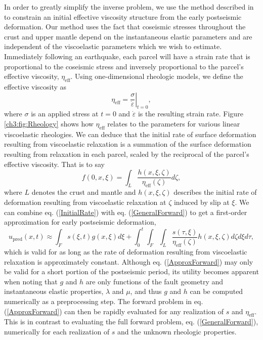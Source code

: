 In order to greatly simplify the inverse problem, we use the method
described in \citet{Hines2016} to constrain an initial effective
viscosity structure from the early postseismic deformation.  Our
method uses the fact that coseismic stresses throughout the crust and
upper mantle depend on the instantaneous elastic parameters and are
independent of the viscoelastic parameters which we wish to estimate.
Immediately following an earthquake, each parcel will have a strain
rate that is proportional to the coseismic stress and inversely
proportional to the parcel's effective viscosity, $\eta_\mathrm{eff}$.
Using one-dimensional rheologic models, we define the effective
viscosity as
\begin{equation}
  \eta_\mathrm{eff} = \left.\frac{\sigma}{\dot{\varepsilon}}\right|_{t=0},
\end{equation}
where $\sigma$ is an applied stress at $t=0$ and $\dot\varepsilon$ is
the resulting strain rate.  Figure \ref{ch3:fig:Rheology} shows how
$\eta_\mathrm{eff}$ relates to the parameters for various linear
viscoelastic rheologies.  We can deduce that the initial rate of
surface deformation resulting from viscoelastic relaxation is a
summation of the surface deformation resulting from relaxation in each
parcel, scaled by the reciprocal of the parcel's effective viscosity.
That is to say
\begin{equation}\label{InitialRate}
  f(0,x,\xi) = \int_L \frac{h(x,\xi,\zeta)}{\eta_\mathrm{eff}(\zeta)} d\zeta, 
\end{equation}
where $L$ denotes the crust and mantle and $h(x,\xi,\zeta)$ describes
the initial rate of deformation resulting from viscoelastic relaxation
at $\zeta$ induced by slip at $\xi$. We can combine eq.
(\ref{InitialRate}) with eq. (\ref{GeneralForward}) to get a
first-order approximation for early postseismic deformation,
\begin{equation}\label{ApproxForward}
  u_\mathrm{pred}(x,t) \approx \int_F s(\xi,t)g(x,\xi)d\xi + 
           \int_0^t\int_F\int_L \frac{s(\tau,\xi)}{\eta_\mathrm{eff}(\zeta)} h(x,\xi,\zeta) d\zeta d\xi d\tau,
\end{equation}
which is valid for as long as the rate of deformation resulting from
viscoelastic relaxation is approximately constant.  Although eq.
(\ref{ApproxForward}) may only be valid for a short portion of the
postseismic period, its utility becomes apparent when noting that $g$
and $h$ are only functions of the fault geometry and instantaneous
elastic properties, $\lambda$ and $\mu$, and thus $g$ and $h$ can be
computed numerically as a preprocessing step.  The forward problem in
eq. (\ref{ApproxForward}) can then be rapidly evaluated for any
realization of $s$ and $\eta_{\mathrm{eff}}$.  This is in contrast to
evaluating the full forward problem, eq. (\ref{GeneralForward}),
numerically for each realization of $s$ and the unknown rheologic
properties.

